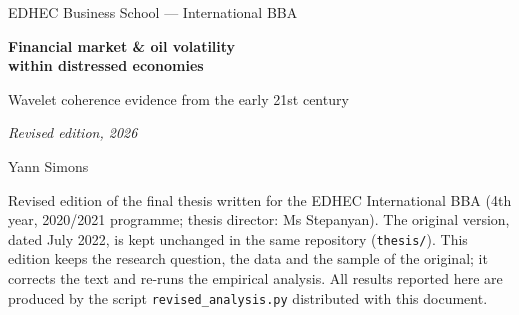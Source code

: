 \documentclass[11pt,a4paper]{article}
\begin{document}
\begin{titlepage}
\centering
\vspace*{2.5cm}
{\small EDHEC Business School --- International BBA\par}
\vspace{1.8cm}
{\LARGE\bfseries Financial market \& oil volatility\\[4pt] within distressed economies\par}
\vspace{0.5cm}
{\large Wavelet coherence evidence from the early 21st century\par}
\vspace{1.2cm}
{\large\itshape Revised edition, 2026\par}
\vspace{2cm}
{\Large Yann Simons\par}
\vfill
\begin{minipage}{0.86\textwidth}
\small
Revised edition of the final thesis written for the EDHEC International BBA
(4th year, 2020/2021 programme; thesis director: Ms Stepanyan). The original
version, dated July 2022, is kept unchanged in the same repository
(\texttt{thesis/}). This edition keeps the research question, the data and the
sample of the original; it corrects the text and re-runs the empirical analysis.
All results reported here are produced by the script
\texttt{revised\_analysis.py} distributed with this document.
\end{minipage}
\vspace{1.5cm}
\end{titlepage}

\begin{abstract}
\noindent
This thesis asks how oil prices respond to geopolitical and economic uncertainty
during crises. Using monthly data for West Texas Intermediate (WTI) crude oil,
the Economic Policy Uncertainty index (EPU) of \citet{baker2016} and the
Geopolitical Risk index (GPR) of \citet{caldara2022} from January 2000 to March
2022, I combine classical time-series tools with bivariate wavelet coherence.
Oil prices are non-stationary in levels, so all models are estimated in log
changes. Rising economic policy uncertainty is associated with falling oil
prices: the contemporaneous elasticity is $-0.074$ (HAC $p=0.026$), and lagged
uncertainty adds a further negative effect, although uncertainty explains only a
small share of monthly oil-price variance. Geopolitical risk shows no significant
association with oil returns on average. Wavelet coherence locates the
EPU--oil link in crisis periods (2001--2004, 2007--2010, 2018--2021), mainly at
8--16-month horizons and in anti-phase; uncertainty leads oil during the
early-2000s and the global financial crisis, while oil leads during the
pandemic. Coherence between oil and geopolitical risk is weaker and confined to
2000--2004. Economic uncertainty, rather than geopolitical risk, is the more
consistent companion of oil-market stress over the sample.

\medskip\noindent
\textbf{Keywords:} oil price, economic policy uncertainty, geopolitical risk,
wavelet coherence, Granger causality.
\end{abstract}
\end{document}
